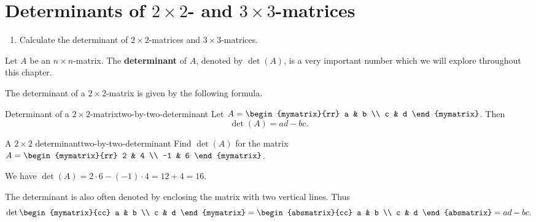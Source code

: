 \section{Determinants of \texorpdfstring{$2\times 2$}{2x2}- and \texorpdfstring{$3\times 3$}{3x3}-matrices}

\begin{outcome}
  \begin{enumerate}
    \item Calculate the determinant of $2\times 2$-matrices and
      $3\times 3$-matrices.
  \end{enumerate}
\end{outcome}

Let $A$ be an $n\times n$-matrix. The \textbf{determinant}%
 of $A$, denoted by $\det(A)$, is a very important
number which we will explore throughout this chapter.

The determinant of a $2\times 2$-matrix is given by the following
formula.

\begin{definition}{Determinant of a $2\times 2$-matrix}{two-by-two-determinant}
  Let $A=\begin{mymatrix}{rr}
    a & b \\
    c & d
  \end{mymatrix}$. Then
  \begin{equation*}
    \det(A) = ad-bc.
  \end{equation*}
\end{definition}

\begin{example}{A $2\times 2$ determinant}{two-by-two-determinant}
  Find $\det(A)$ for the matrix
  $A =  \begin{mymatrix}{rr}
    2 & 4 \\
    -1 & 6
  \end{mymatrix}$.
\end{example}

\begin{solution}
  We have $\det(A) = 2\cdot 6 - (-1)\cdot 4 = 12 + 4 = 16$.
\end{solution}

The determinant is also often denoted by enclosing the matrix with two
vertical lines. Thus
\begin{equation*}
  \det \begin{mymatrix}{cc}
    a & b \\
    c & d
  \end{mymatrix} =\begin{absmatrix}{cc}
    a & b \\
    c & d
  \end{absmatrix}
  = ad - bc.
\end{equation*}

